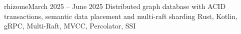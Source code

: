 
{
   \begin{projects}
      \project
         {rhizome}{March 2025 -- June 2025}
         {}
         {Distributed graph database with ACID transactions, semantic data placement and multi-raft sharding}
         {Rust, Kotlin, gRPC, Multi-Raft, MVCC, Percolator, SSI}
   \end{projects}
}
